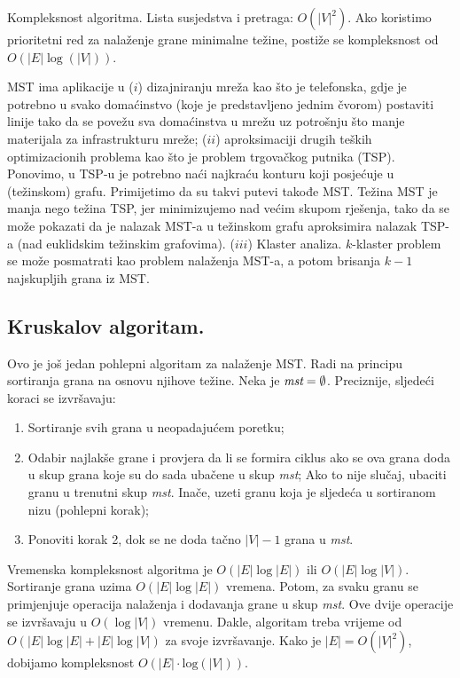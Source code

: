 \documentclass[a4paper, utf8, 11pt, colorlinks]{book}
\begin{document}
Kompleksnost algoritma. Lista susjedstva i pretraga: $O(|V|^2)$. Ako  koristimo prioritetni red za nalaženje grane minimalne težine, postiže se kompleksnost od $O( |E| \log(|V|))$. 

MST ima aplikacije u ($i$) dizajniranju mreža kao što je telefonska, gdje je potrebno u svako domaćinstvo (koje je predstavljeno jednim čvorom) postaviti linije tako da se povežu sva domaćinstva u mrežu uz potrošnju što manje materijala za infrastrukturu mreže; ($ii$) aproksimaciji drugih teških optimizacionih problema kao što je problem trgovačkog putnika (TSP). Ponovimo, u TSP-u je potrebno naći najkraću konturu koji posjećuje u (težinskom) grafu. Primijetimo da su takvi putevi takođe MST. Težina MST je manja nego težina TSP, jer minimizujemo nad većim skupom rješenja, tako da se može pokazati da je nalazak MST-a u težinskom grafu aproksimira nalazak TSP-a (nad euklidskim težinskim grafovima).  
($iii$) Klaster analiza. $k$-klaster problem  se može posmatrati kao problem nalaženja MST-a, a potom brisanja $k-1$ najskupljih grana iz MST. 

\subsection{Kruskalov algoritam.}

Ovo je još jedan pohlepni algoritam za nalaženje MST. Radi na principu sortiranja 
grana na osnovu njihove težine. Neka je $\emph{mst} = \emptyset$. Preciznije, sljedeći koraci se izvršavaju:

\begin{enumerate}
	\item Sortiranje svih grana u neopadajućem poretku;
	\item Odabir najlakše grane i provjera da li se formira ciklus ako se ova 
	grana doda u skup grana koje su do sada ubačene u skup \emph{mst}; Ako to nije slučaj, ubaciti granu u trenutni skup \emph{mst}. Inače, uzeti granu koja je sljedeća u sortiranom nizu (pohlepni korak);
	\item Ponoviti korak 2, dok se ne doda tačno $|V|-1$ grana u \emph{mst}.
\end{enumerate} 

\noindent Vremenska kompleksnost algoritma je $O(|E|\log |E|)$ ili $O(|E|\log |V|)$. Sortiranje grana uzima $O(|E| \log|E|)$ vremena. Potom, za svaku granu 
se primjenjuje operacija nalaženja i dodavanja grane u skup \emph{mst}. Ove dvije operacije se izvršavaju u $O(\log |V|)$ vremenu. Dakle, algoritam treba vrijeme od $O(|E|\log |E| + |E|\log |V|)$ za svoje izvršavanje. Kako je $|E|=O(|V|^2)$, dobijamo kompleksnost $O(|E| \cdot \mathrm{log}(|V|))$. 
\end{document}
